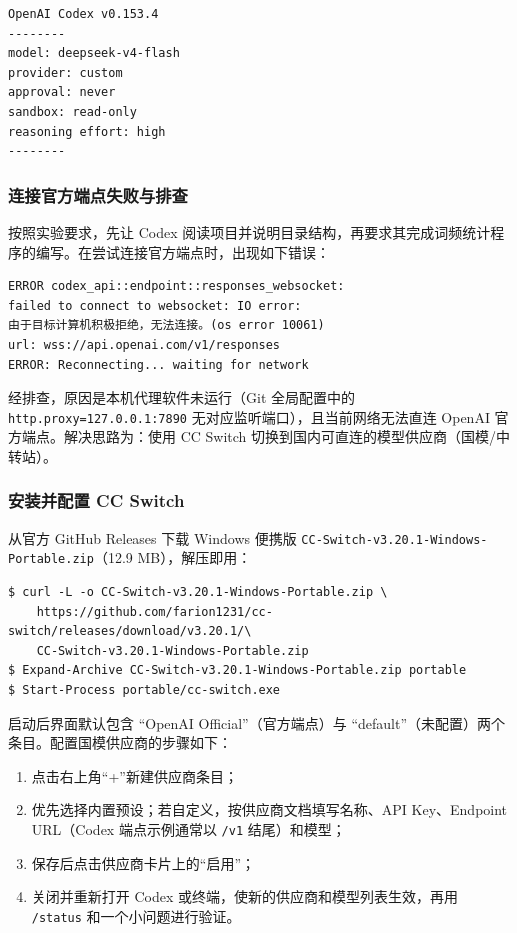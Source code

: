 \documentclass{SYSUReport}
\begin{document}
\begin{lstlisting}[caption={Codex 启动时的供应商与模型配置}]
OpenAI Codex v0.153.4
--------
model: deepseek-v4-flash
provider: custom
approval: never
sandbox: read-only
reasoning effort: high
--------
\end{lstlisting}

\subsubsection{连接官方端点失败与排查}

按照实验要求，先让 Codex 阅读项目并说明目录结构，再要求其完成词频统计程序的编写。在尝试连接官方端点时，出现如下错误：

\begin{lstlisting}[caption={Codex 连接官方端点失败}]
ERROR codex_api::endpoint::responses_websocket:
failed to connect to websocket: IO error:
由于目标计算机积极拒绝，无法连接。(os error 10061)
url: wss://api.openai.com/v1/responses
ERROR: Reconnecting... waiting for network
\end{lstlisting}

经排查，原因是本机代理软件未运行（Git 全局配置中的 \texttt{http.proxy=127.0.0.1:7890} 无对应监听端口），且当前网络无法直连 OpenAI 官方端点。解决思路为：使用 CC Switch 切换到国内可直连的模型供应商（国模/中转站）。

\subsubsection{安装并配置 CC Switch}

从官方 GitHub Releases 下载 Windows 便携版 \texttt{CC-Switch-v3.20.1-Windows-Portable.zip}（12.9 MB），解压即用：

\begin{lstlisting}[caption={下载解压并启动 CC Switch}]
$ curl -L -o CC-Switch-v3.20.1-Windows-Portable.zip \
    https://github.com/farion1231/cc-switch/releases/download/v3.20.1/\
    CC-Switch-v3.20.1-Windows-Portable.zip
$ Expand-Archive CC-Switch-v3.20.1-Windows-Portable.zip portable
$ Start-Process portable/cc-switch.exe
\end{lstlisting}

启动后界面默认包含 “OpenAI Official”（官方端点）与 “default”（未配置）两个条目。配置国模供应商的步骤如下：

\begin{enumerate}
    \item 点击右上角“+”新建供应商条目；
    \item 优先选择内置预设；若自定义，按供应商文档填写名称、API Key、Endpoint URL（Codex 端点示例通常以 \texttt{/v1} 结尾）和模型；
    \item 保存后点击供应商卡片上的“启用”；
    \item 关闭并重新打开 Codex 或终端，使新的供应商和模型列表生效，再用 \texttt{/status} 和一个小问题进行验证。
\end{enumerate}
\end{document}
